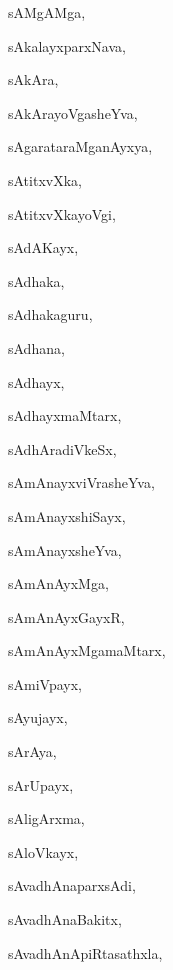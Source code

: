 \begin{multicols}{3}
{\noindent
{sAMgAMga}, \pageref{sAMgAMga}

\noindent
{sAkalayxparxNava}, \pageref{sAkalayxparxNava}

\noindent
{sAkAra}, \pageref{sAkAra}

\noindent
{sAkArayoVgasheYva}, \pageref{sAkArayoVgasheYva}

\noindent
{sAgarataraMganAyxya}, \pageref{sAgarataraMganAyxya}

\noindent
{sAtitxvXka}, \pageref{sAtitxvXka}

\noindent
{sAtitxvXkayoVgi}, \pageref{sAtitxvXkayoVgi}

\noindent
{sAdAKayx}, \pageref{sAdAKayx}

\noindent
{sAdhaka}, \pageref{sAdhaka}

\noindent
{sAdhakaguru}, \pageref{sAdhakaguru}

\noindent
{sAdhana}, \pageref{sAdhana}

\noindent
{sAdhayx}, \pageref{sAdhayx}

\noindent
{sAdhayxmaMtarx}, \pageref{sAdhayxmaMtarx}

\noindent
{sAdhAradiVkeSx}, \pageref{sAdhAradiVkeSx}

\noindent
{sAmAnayxviVrasheYva}, \pageref{sAmAnayxviVrasheYva}

\noindent
{sAmAnayxshiSayx}, \pageref{sAmAnayxshiSayx}

\noindent
{sAmAnayxsheYva}, \pageref{sAmAnayxsheYva}

\noindent
{sAmAnAyxMga}, \pageref{sAmAnAyxMga}

\noindent
{sAmAnAyxGayxR}, \pageref{sAmAnAyxGayxR}

\noindent
{sAmAnAyxMgamaMtarx}, \pageref{sAmAnAyxMgamaMtarx}

\noindent
{sAmiVpayx}, \pageref{sAmiVpayx}

\noindent
{sAyujayx}, \pageref{sAyujayx}

\noindent
{sArAya}, \pageref{sArAya}

\noindent
{sArUpayx}, \pageref{sArUpayx}

\noindent
{sAligArxma}, \pageref{sAligArxma}

\noindent
{sAloVkayx}, \pageref{sAloVkayx}

\noindent
{sAvadhAnaparxsAdi}, \pageref{sAvadhAnaparxsAdi}

\noindent
{sAvadhAnaBakitx}, \pageref{sAvadhAnaBakitx}

\noindent
{sAvadhAnApiRtasathxla}, \pageref{sAvadhAnApiRtasathxla}

}
\end{multicols}
